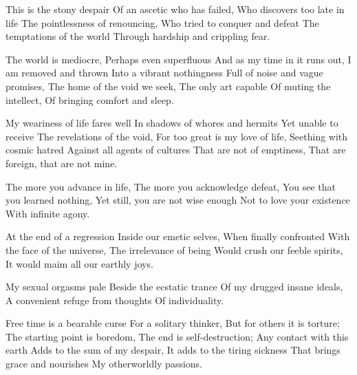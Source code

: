 \documentclass{article}
\newenvironment{stanza}{\begin{minipage}{10cm}\begin{internallinenumbers}\obeylines}{\end{internallinenumbers}\end{minipage}\vspace{\baselineskip}}
\begin{document}
\begin{stanza}
This is the stony despair
Of an ascetic who has failed,
Who discovers too late in life
The pointlessness of renouncing,
Who tried to conquer and defeat
The temptations of the world
Through hardship and crippling fear.
\end{stanza}

\begin{stanza}
The world is mediocre,
Perhaps even superfluous
And as my time in it runs out,
I am removed and thrown
Into a vibrant nothingness
Full of noise and vague promises,
The home of the void we seek,
The only art capable
Of muting the intellect,
Of bringing comfort and sleep.
\end{stanza}

\begin{stanza}
My weariness of life fares well
In shadows of whores and hermits
Yet unable to receive
The revelations of the void,
For too great is my love of life,
Seething with cosmic hatred
Against all agents of cultures
That are not of emptiness,
That are foreign, that are not mine.
\end{stanza}

\begin{stanza}
The more you advance in life,
The more you acknowledge defeat,
You see that you learned nothing,
Yet still, you are not wise enough
Not to love your existence
With infinite agony.
\end{stanza}

\begin{stanza}
At the end of a regression
Inside our emetic selves,
When finally confronted
With the face of the universe,
The irrelevance of being
Would crush our feeble spirits,
It would maim all our earthly joys.
\end{stanza}

\begin{stanza}
My sexual orgasms pale
Beside the ecstatic trance
Of my drugged insane ideals,
A convenient refuge from thoughts
Of individuality.
\end{stanza}

\begin{stanza}
Free time is a bearable curse
For a solitary thinker,
But for others it is torture;
The starting point is boredom,
The end is self-destruction;
Any contact with this earth
Adds to the sum of my despair,
It adds to the tiring sickness
That brings grace and nourishes
My otherworldly passions.
\end{stanza}
\end{document}
